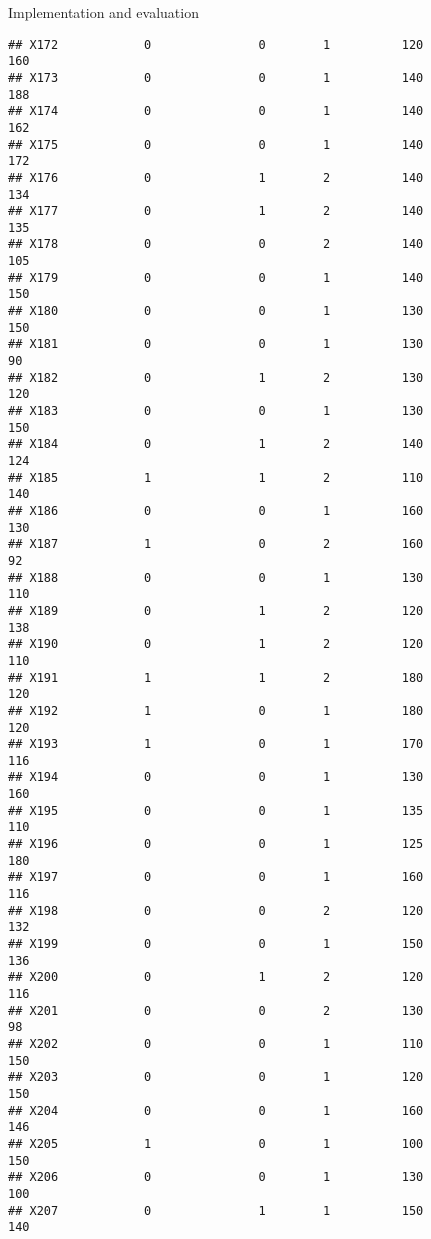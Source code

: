 \documentclass[
  ignorenonframetext,
]{beamer}
\begin{document}
\begin{frame}[fragile]{Implementation and evaluation}
\begin{verbatim}
## X172            0               0        1          120            160
## X173            0               0        1          140            188
## X174            0               0        1          140            162
## X175            0               0        1          140            172
## X176            0               1        2          140            134
## X177            0               1        2          140            135
## X178            0               0        2          140            105
## X179            0               0        1          140            150
## X180            0               0        1          130            150
## X181            0               0        1          130             90
## X182            0               1        2          130            120
## X183            0               0        1          130            150
## X184            0               1        2          140            124
## X185            1               1        2          110            140
## X186            0               0        1          160            130
## X187            1               0        2          160             92
## X188            0               0        1          130            110
## X189            0               1        2          120            138
## X190            0               1        2          120            110
## X191            1               1        2          180            120
## X192            1               0        1          180            120
## X193            1               0        1          170            116
## X194            0               0        1          130            160
## X195            0               0        1          135            110
## X196            0               0        1          125            180
## X197            0               0        1          160            116
## X198            0               0        2          120            132
## X199            0               0        1          150            136
## X200            0               1        2          120            116
## X201            0               0        2          130             98
## X202            0               0        1          110            150
## X203            0               0        1          120            150
## X204            0               0        1          160            146
## X205            1               0        1          100            150
## X206            0               0        1          130            100
## X207            0               1        1          150            140

\end{verbatim}
\end{frame}
\end{document}
